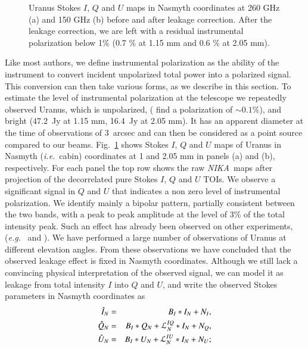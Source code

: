 \documentclass[twocolumn, traditabstract]{aa}
\newcommand{\nika}{{\it NIKA}}
\begin{document}
\begin{figure}
\begin{center}
\begin{picture}
\end{picture}

  \caption{ Uranus Stokes $I$, $Q$ and $U$ maps in Nasmyth coordinates at 260
    GHz (a) and 150 GHz (b) before and after leakage correction. After the
    leakage correction, we are left with a residual instrumental polarization below 1\% (0.7 \% at 1.15 mm and 0.6 \% at 2.05 mm).}
   \label{fig:uranus_lkg}
  \end{center}
\end{figure}

Like most authors, we define instrumental polarization as the ability of the
instrument to convert incident unpolarized total power into a polarized
signal. This conversion can then take various forms, as we describe in this
section. To estimate the level of instrumental polarization at the telescope we
repeatedly observed Uranus, which is unpolarized, (\citealt{polka_apex} find a
polarization of $\sim 0.1 \%$), and bright (47.2~Jy at 1.15 mm, 16.4~Jy at
2.05 mm). It has an apparent diameter at the time of observations of 3~arcsec and
can then be considered as a point source compared to our
beams. Fig.~\ref{fig:uranus_lkg} shows Stokes $I$, $Q$ and $U$ maps of Uranus in
Nasmyth ({\it i.e.}~cabin) coordinates at 1 and 2.05 mm in panels (a) and (b),
respectively.  For each panel the top row shows the raw \nika\ maps after
projection of the decorrelated pure Stokes $I$, $Q$ and $U$ TOIs. We observe a
significant signal in $Q$ and $U$ that indicates a non zero level of
instrumental polarization. We identify mainly a bipolar pattern, partially
consistent between the two bands, with a peak to peak amplitude at the level of
3\% of the total intensity peak. Such an effect has already been observed on
other experiments, ({\it e.g.}~\citealt{thum2008} and
\citealt[][]{2015ApJ...806..206B}).  We have performed a large number of
observations of Uranus at different elevation angles. From these observations we
have concluded that the observed leakage effect is fixed in Nasmyth
coordinates. Although we still lack a convincing physical interpretation of the
observed signal, we can model it as leakage from total intensity $I$ into $Q$
and $U$, and write the observed Stokes parameters in Nasmyth coordinates as
 \begin{eqnarray}
 \hat{I}_{N}  & = & B_{I} * I_{N} + N_{I}, \label{eq:i_leak}\\
 \hat{Q}_{N}  & = & B_{I} * Q_{N} + {\cal{L}}^{IQ}_{N} * I_{N} + N_{Q}, \label{eq:q_leak} \\
 \hat{U}_{N}  & = & B_{I} * U_{N} + {\cal{L}}^{IU}_{N} * I_{N} + N_{U}; \label{eq:u_leak}
 \end{eqnarray}
\end{document}
